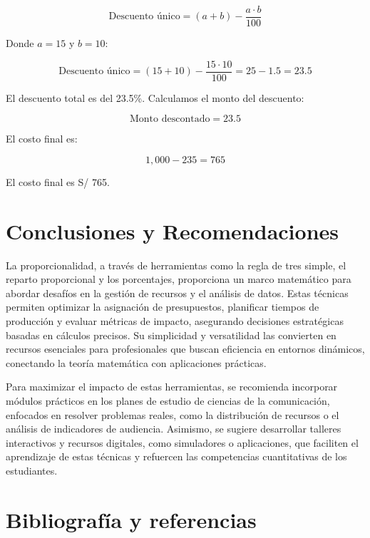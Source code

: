 \documentclass[
  stu,
  floatsintext,
  longtable,
  a4paper,
  nolmodern,
  notxfonts,
  notimes,
  colorlinks=true,linkcolor=blue,citecolor=blue,urlcolor=blue]{apa7}
\begin{document}
\[
\text{Descuento único} = (a + b) - \frac{a \cdot b}{100}
\]

Donde \(a = 15%
\) y \(b = 10%
\):

\[
\text{Descuento único} = (15 + 10) - \frac{15 \cdot 10}{100} = 25 - 1.5 = 23.5
\]

El descuento total es del 23.5\%. Calculamos el monto del descuento:

\[
\text{Monto descontado} = 23.5%
\]

El costo final es:

\[
1,000 - 235 = 765
\]

El costo final es S/ 765.

\section{Conclusiones y
Recomendaciones}\label{conclusiones-y-recomendaciones}

La proporcionalidad, a través de herramientas como la regla de tres
simple, el reparto proporcional y los porcentajes, proporciona un marco
matemático para abordar desafíos en la gestión de recursos y el análisis
de datos. Estas técnicas permiten optimizar la asignación de
presupuestos, planificar tiempos de producción y evaluar métricas de
impacto, asegurando decisiones estratégicas basadas en cálculos
precisos. Su simplicidad y versatilidad las convierten en recursos
esenciales para profesionales que buscan eficiencia en entornos
dinámicos, conectando la teoría matemática con aplicaciones prácticas.

Para maximizar el impacto de estas herramientas, se recomienda
incorporar módulos prácticos en los planes de estudio de ciencias de la
comunicación, enfocados en resolver problemas reales, como la
distribución de recursos o el análisis de indicadores de audiencia.
Asimismo, se sugiere desarrollar talleres interactivos y recursos
digitales, como simuladores o aplicaciones, que faciliten el aprendizaje
de estas técnicas y refuercen las competencias cuantitativas de los
estudiantes.

\section{Bibliografía y
referencias}\label{bibliografuxeda-y-referencias}
\end{document}
